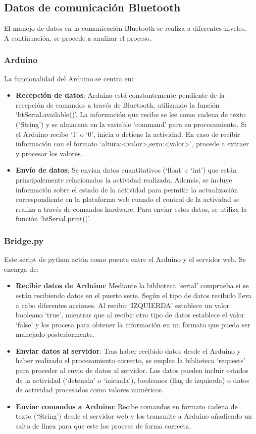 \subsection{Datos de comunicación Bluetooth}
El manejo de datos en la comunicación Bluetooth se realiza a diferentes niveles. A continuación, se procede a analizar el proceso.

\subsubsection{Arduino}
La funcionalidad del Arduino se centra en:
\begin{itemize}
    \item \textbf{Recepción de datos}: Arduino está constantemente pendiente de la recepción de comandos a través de Bluetooth, utilizando la función `btSerial.available()'. La información que recibe se lee como cadena de texto (`String') y se almacena en la variable `command' para su procesamiento. Si el Arduino recibe `1' o `0', inicia o detiene la actividad. En caso de recibir información con el formato `altura:<valor>,sexo:<valor>', procede a extraer y procesar los valores.
    \item \textbf{Envío de datos}: Se envían datos cuantitativos (`float' e `int') que están principalemente relacionados la actividad realizada. Además, se incluye información sobre el estado de la actividad para permitir la actualización correspondiente en la plataforma web cuando el control de la actividad se realiza a través de comandos hardware. Para enviar estos datos, se utiliza la función `btSerial.print()'.
\end{itemize}

\subsubsection{Bridge.py}
Este script de python actúa como puente entre el Arduino y el servidor web. Se encarga de:
\begin{itemize}
    \item \textbf{Recibir datos de Arduino}: Mediante la biblioteca `serial' comprueba si se están recibiendo datos en el puerto serie. Según el tipo de datos recibido lleva a cabo diferentes acciones. Al recibir `IZQUIERDA' establece un valor booleano `true', mientras que al recibir otro tipo de datos establece el valor `false' y los procesa para obtener la información en un formato que pueda ser manejado posteriormente.
    \item \textbf{Enviar datos al servidor}: Tras haber recibido datos desde el Arduino y haber realizado el procesamiento correcto, se emplea la biblioteca `requests' para proceder al envio de datos al servidor. Los datos pueden incluir estados de la actividad (`detenida' o `iniciada'), booleanos (flag de izquierda) o datos de actividad procesados como valores numéricos.
    \item \textbf{Enviar comandos a Arduino}: Recibe comandos en formato cadena de texto (`String') desde el servidor web y los transmite a Arduino añadiendo un salto de línea para que este los procese de forma correcta.
\end{itemize}

